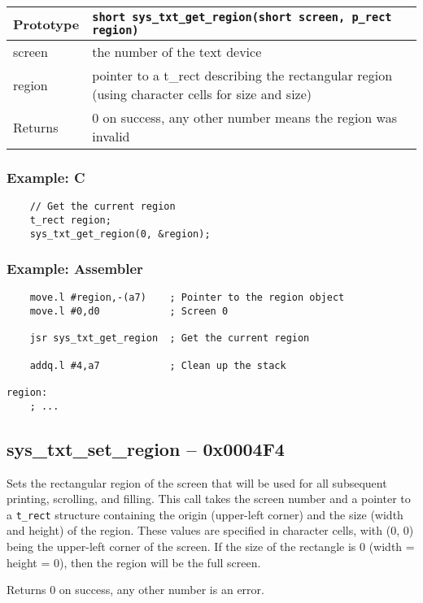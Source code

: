 \bigskip

\begin{tabular}{|l||l|} \hline
Prototype & \lstinline!short sys_txt_get_region(short screen, p_rect region)! \\ \hline
screen & the number of the text device \\ \hline
region & pointer to a t\_rect describing the rectangular region (using character cells for size and size) \\ \hline
Returns & 0 on success, any other number means the region was invalid \\ \hline
\end{tabular}

\subsubsection*{Example: C}
\begin{lstlisting}
    // Get the current region
    t_rect region;
    sys_txt_get_region(0, &region);
\end{lstlisting}

\subsubsection*{Example: Assembler}
\begin{verbatim}
    move.l #region,-(a7)    ; Pointer to the region object
    move.l #0,d0            ; Screen 0

    jsr sys_txt_get_region  ; Get the current region

    addq.l #4,a7            ; Clean up the stack

region:
    ; ...
\end{verbatim}


\subsection*{sys\_txt\_set\_region -- 0x0004F4}
Sets the rectangular region of the screen that will be used for all subsequent printing, scrolling, and filling.
This call takes the screen number and a pointer to a \verb+t_rect+ structure containing the origin (upper-left corner) and the size (width and height)
of the region. These values are specified in character cells, with (0, 0) being the upper-left corner of the screen.
If the size of the rectangle is 0 (width = height = 0), then the region will be the full screen.

Returns 0 on success, any other number is an error.

